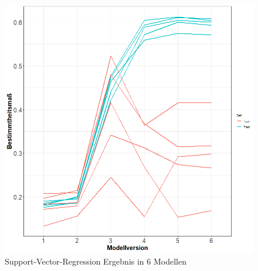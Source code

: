 \documentclass[a4paper,12pt]{thesis}
\begin{document}
\begin{figure}[!ht]
	\centering
	\includegraphics[width=\textwidth]{Plots/plot44.png}
	\caption{Support-Vector-Regression Ergebnis in 6 Modellen}
	\label{SVR_ModelSelection}
\end{figure}
\end{document}
